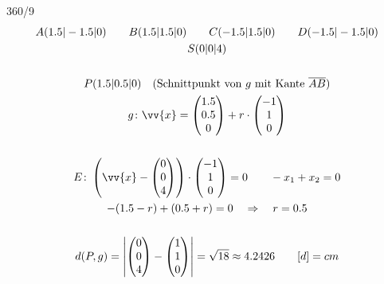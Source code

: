 \begin{exercise}{360/9}
  \begin{gather*}
    A(1.5|-1.5|0) \qquad B(1.5|1.5|0) \qquad C(-1.5|1.5|0) \qquad D(-1.5|-1.5|0) \\
    S(0|0|4) \\\\
    P(1.5|0.5|0) \quad \text{(Schnittpunkt von $g$ mit Kante $\overline{AB}$)} \\
    g \colon \vv{x} = \begin{pmatrix}1.5 \\ 0.5 \\ 0\end{pmatrix} + r \cdot \begin{pmatrix}-1 \\ 1 \\ 0\end{pmatrix} \\\\
    E \colon \left(\vv{x} - \begin{pmatrix}0 \\ 0 \\ 4\end{pmatrix}\right) \cdot \begin{pmatrix}-1 \\ 1 \\ 0\end{pmatrix} = 0 \qquad -x_1 + x_2 = 0 \\
    -(1.5 - r) + (0.5 + r) = 0 \quad\Rightarrow\quad r = 0.5 \\\\
    d(P, g) = \left|\begin{pmatrix}0 \\ 0 \\ 4\end{pmatrix} - \begin{pmatrix}1 \\ 1 \\ 0\end{pmatrix}\right| = \sqrt{18} \approx 4.2426 \qquad [d] = cm
  \end{gather*}
\end{exercise}

